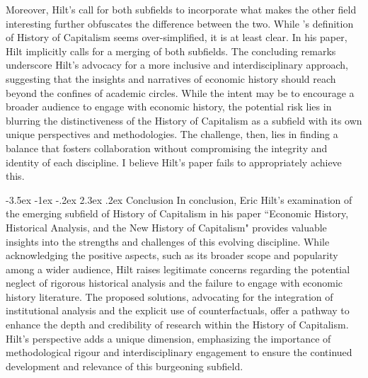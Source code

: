\documentclass[11pt]{article}
\makeatletter
\newcommand{\bb}{\bigbreak\noindent}
\renewcommand\section{\leftskip 0pt\@startsection {section}{1}{\z@}%
	{-3.5ex \@plus -1ex \@minus -.2ex}%
	{2.3ex \@plus.2ex}%
	{\normalfont\Large\bfseries}}
\makeatother
\begin{document}
\begin{spacing}{1.7}
		\bb
		Moreover, Hilt's call for both subfields to incorporate what makes the other field interesting further obfuscates the difference between the two. While \cite{beckert2012history}'s definition of History of Capitalism seems over-simplified, it is at least clear. In his paper, Hilt implicitly calls for a merging of both subfields. 
		The concluding remarks underscore Hilt's advocacy for a more inclusive and interdisciplinary approach, suggesting that the insights and narratives of economic history should reach beyond the confines of academic circles. While the intent may be to encourage a broader audience to engage with economic history, the potential risk lies in blurring the distinctiveness of the History of Capitalism as a subfield with its own unique perspectives and methodologies. The challenge, then, lies in finding a balance that fosters collaboration without compromising the integrity and identity of each discipline. I believe Hilt's paper fails to appropriately achieve this. 
		
		\section{Conclusion}
		In conclusion, Eric Hilt's examination of the emerging subfield of History of Capitalism in his paper ``Economic History, Historical Analysis, and the New History of Capitalism" provides valuable insights into the strengths and challenges of this evolving discipline. While acknowledging the positive aspects, such as its broader scope and popularity among a wider audience, Hilt raises legitimate concerns regarding the potential neglect of rigorous historical analysis and the failure to engage with economic history literature. The proposed solutions, advocating for the integration of institutional analysis and the explicit use of counterfactuals, offer a pathway to enhance the depth and credibility of research within the History of Capitalism. Hilt's perspective adds a unique dimension, emphasizing the importance of methodological rigour and interdisciplinary engagement to ensure the continued development and relevance of this burgeoning subfield.
		
		
		\pagebreak
		\printbibliography
		
	\end{spacing}
\end{document}
